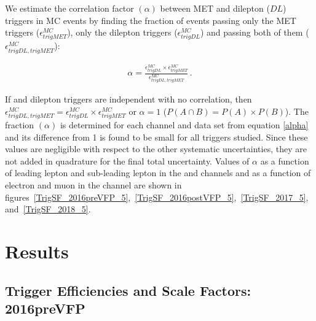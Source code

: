 We estimate the correlation factor $(\alpha)$ between MET and dilepton ($DL$) triggers in \ttbar MC events by finding the fraction of events passing only the MET triggers ($\epsilon_{trigMET}^{MC}$), only the dilepton triggers ($\epsilon_{trigDL}^{MC}$) and passing both of them ($\epsilon_{trigDL,trigMET}^{MC}$): 
\begin{linenomath*}
\begin{align}
\alpha=\frac{\epsilon_{trigDL}^{MC} \times \epsilon_{trigMET}^{MC}}{\epsilon_{trigDL,trigMET}^{MC}} \, .
\label{alpha}
\end{align}
\end{linenomath*}
If \MET and dilepton triggers are independent with no correlation, then $\epsilon_{trigDL,trigMET}^{MC} = \epsilon_{trigDL}^{MC} \times \epsilon_{trigMET}^{MC}$ or $\alpha = 1$ ($P(A \cap B) = P(A) \times P(B)$).
The fraction $(\alpha)$ is determined for each channel and data set from equation \ref{alpha} and its difference from 1 is found to be small for all triggers studied. 
Since these values are negligible with respect to the other systematic uncertainties, they are not added in quadrature for the final total uncertainty. 
Values of $\alpha$ as a function of leading lepton \pT and sub-leading lepton \pT in the \ee and \mumu channels and as a function of electron \pT and muon \pT in the \emu channel are shown in figures~\ref{TrigSF_2016preVFP_5},~\ref{TrigSF_2016postVFP_5},~\ref{TrigSF_2017_5}, and~\ref{TrigSF_2018_5}. 

\section{Results}

\subsection{Trigger Efficiencies and Scale Factors: 2016preVFP}
\label{TrigSFResults2016preVFP}

